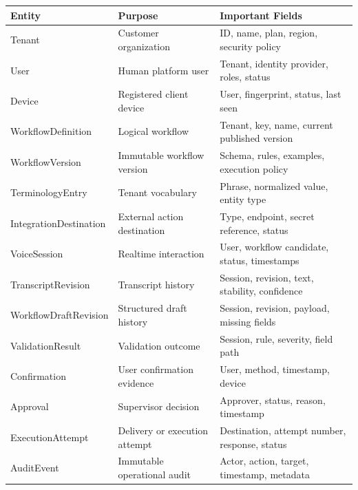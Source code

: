 \documentclass[11pt,a4paper]{article}
\begin{document}
\begin{longtable}{L{38mm}L{46mm}L{76mm}}
\toprule
\textbf{Entity} & \textbf{Purpose} & \textbf{Important Fields} \\
\midrule
\endhead

Tenant
& Customer organization
& ID, name, plan, region, security policy \\

User
& Human platform user
& Tenant, identity provider, roles, status \\

Device
& Registered client device
& User, fingerprint, status, last seen \\

WorkflowDefinition
& Logical workflow
& Tenant, key, name, current published version \\

WorkflowVersion
& Immutable workflow version
& Schema, rules, examples, execution policy \\

TerminologyEntry
& Tenant vocabulary
& Phrase, normalized value, entity type \\

IntegrationDestination
& External action destination
& Type, endpoint, secret reference, status \\

VoiceSession
& Realtime interaction
& User, workflow candidate, status, timestamps \\

TranscriptRevision
& Transcript history
& Session, revision, text, stability, confidence \\

WorkflowDraftRevision
& Structured draft history
& Session, revision, payload, missing fields \\

ValidationResult
& Validation outcome
& Session, rule, severity, field path \\

Confirmation
& User confirmation evidence
& User, method, timestamp, device \\

Approval
& Supervisor decision
& Approver, status, reason, timestamp \\

ExecutionAttempt
& Delivery or execution attempt
& Destination, attempt number, response, status \\

AuditEvent
& Immutable operational audit
& Actor, action, target, timestamp, metadata \\
\bottomrule
\end{longtable}
\end{document}
